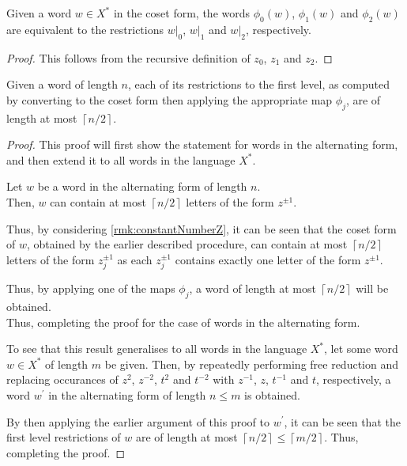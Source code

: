 \begin{proposition}
	\label{prop:word-restrictions}
	Given a word $w \in X^\ast$ in the coset form, the words $\phi_0(w)$, $\phi_1(w)$ and $\phi_2(w)$ are equivalent to the restrictions $\left. w \right\vert_0$, $\left. w \right\vert_1$ and $\left. w \right\vert_2$, respectively.
\end{proposition}

\begin{proof}
	This follows from the recursive definition of $z_0$, $z_1$ and $z_2$.
\end{proof}

\begin{proposition}
	\label{prop:phiLengthReduce}
	Given a word of length $n$, each of its restrictions to the first level, as computed by converting to the coset form then applying the appropriate map $\phi_j$, are of length at most $\left\lceil n / 2 \right\rceil$.
\end{proposition}

\begin{proof}
	This proof will first show the statement for words in the alternating form, and then extend it to all words in the language $X^\ast$.
	
	Let $w$ be a word in the alternating form of length $n$.\\
	Then, $w$ can contain at most $\left\lceil n/2 \right\rceil$ letters of the form $z^{\pm 1}$.
	
	Thus, by considering \cref{rmk:constantNumberZ}, it can be seen that the coset form of $w$, obtained by the earlier described procedure, can contain at most $\left\lceil n/2 \right\rceil$ letters of the form $z_j^{\pm 1}$ as each $z_j^{\pm 1}$ contains exactly one letter of the form $z^{\pm 1}$.
	
	Thus, by applying one of the maps $\phi_j$, a word of length at most $\left\lceil n/2 \right\rceil$ will be obtained.\\
	Thus, completing the proof for the case of words in the alternating form.
	
	To see that this result generalises to all words in the language $X^\ast$, let some word $w \in X^\ast$ of length $m$ be given.
	Then, by repeatedly performing free reduction and replacing occurances of $z^2$, $z^{-2}$, $t^{2}$ and $t^{-2}$ with $z^{-1}$, $z$, $t^{-1}$ and $t$, respectively, a word $w^\prime$ in the alternating form of length $n\leq m$ is obtained.
	
	By then applying the earlier argument of this proof to $w^\prime$, it can be seen that the first level restrictions of $w$ are of length at most $\left\lceil n / 2 \right\rceil \leq \left\lceil m / 2 \right\rceil$.
	Thus, completing the proof.
\end{proof}

